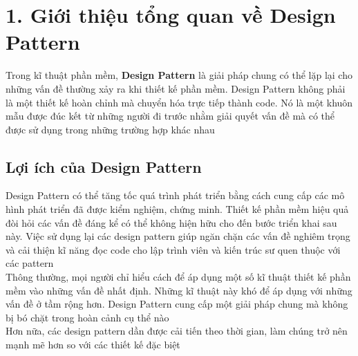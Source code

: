 
\chapter{1. Giới thiệu tổng quan về Design Pattern}
Trong kĩ thuật phần mềm, \textbf{Design Pattern} là giải pháp chung có thể lặp lại cho những vấn đề thường xảy ra khi thiết kế phần mềm. Design Pattern không phải là một thiết kế hoàn chỉnh mà chuyển hóa trực tiếp thành code. Nó là một khuôn mẫu được đúc kết từ những người đi trước nhằm giải quyết vấn đề mà có thể được sử dụng trong những trường hợp khác nhau

\section{Lợi ích của Design Pattern}
Design Pattern có thể tăng tốc quá trình phát triển bằng cách cung cấp các mô hình phát triển đã được kiểm nghiệm, chứng minh. Thiết kế phần mềm hiệu quả đòi hỏi các vấn đề đáng kể có thể không hiện hữu cho đến bước triển khai sau này. Việc sử dụng lại các design pattern giúp ngăn chặn các vấn đề nghiêm trọng và cải thiện kĩ năng đọc code cho lập trình viên và kiến trúc sư quen thuộc với các pattern\\[0.1in]
Thông thường, mọi người chỉ hiểu cách để áp dụng một số kĩ thuật thiết kế phần mềm vào những vấn đề nhất định. Những kĩ thuật này khó để áp dụng với những vấn đề ở tầm rộng hơn. Design Pattern cung cấp một giải pháp chung mà không bị bó chặt trong hoàn cảnh cụ thể nào \\[0.1in]
Hơn nữa, các design pattern dần được cải tiến theo thời gian, làm chúng trở nên mạnh mẽ hơn so với các thiết kế đặc biệt

